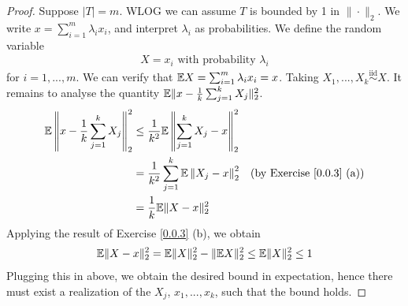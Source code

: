 \begin{proof}
Suppose $|T| = m$. WLOG we can assume $T$ is bounded by 1 in $\|\cdot\|_2$. We write $x = \sum_{i=1}^m\lambda_i x_i$, and interpret $\lambda_i$ as probabilities. We define the random variable
\begin{align*}
    X = x_i \text{ with probability } \lambda_i
\end{align*}
for $i=1,...,m$. We can verify that $\mathbb{E} X = \sum_{i=1}^m \lambda_i x_i = x$. Taking $X_1,...,X_k \overset{\text{iid}}{\sim} X$. It remains to analyse the quantity $\mathbb{E} \|x - \frac 1 k \sum_{j=1}^k X_j\|_2^2$.
\begin{align*}
    \mathbb{E} \left\| x - \frac 1 k \sum_{j=1}^k X_j\right\|_2^2 &\leq \frac{1}{k^2}\mathbb{E} \left\|\sum_{j=1}^k X_j -x\right\|_2^2 \\
    &= \frac{1}{k^2} \sum_{j=1}^k \mathbb{E} \left\| X_j - x \right\|_2^2  &\text{(by Exercise \ref{0.0.3} (a))}\\
    &= \frac 1  k \mathbb{E} \|X - x\|^2_2
\end{align*}
Applying the result of Exercise \ref{0.0.3} (b), we obtain
\begin{align*}
    \mathbb{E} \|X - x\|^2_2 = \mathbb{E}\|X\|_2^2 - \|\mathbb{E} X\|_2^2 \leq \mathbb{E} \|X\|_2^2 \leq 1
\end{align*}
Plugging this in above, we obtain the desired bound in expectation, hence there must exist a realization of the $X_j$, $x_1,...,x_k$, such that the bound holds.
\end{proof}

